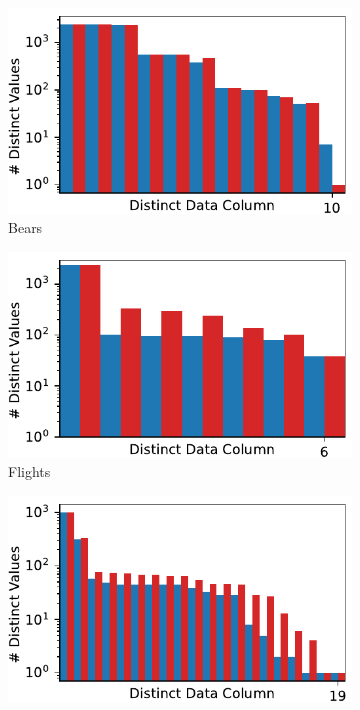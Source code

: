 \begin{figure}[!t]
    \centering 
    \centering
\begin{subfigure}{0.4\textwidth}
    \includegraphics[width=\textwidth]{figures/plot/distinct/beers_distinct/combined.pdf}
    \caption{\label{exp:d1}Bears}
    \label{exp:distincts_bears}
\end{subfigure}
\hfill
\begin{subfigure}{0.4\textwidth}
    \includegraphics[width=\textwidth]{figures/plot/distinct/flights_distinct/combined.pdf}
    \caption{Flights}
    \label{exp:distincts_flights}
\end{subfigure}
\hfill
\begin{subfigure}{0.4\textwidth}
    \includegraphics[width=\textwidth]{figures/plot/distinct/hospital_distinct/combined.pdf}

\end{subfigure}
\end{figure}
